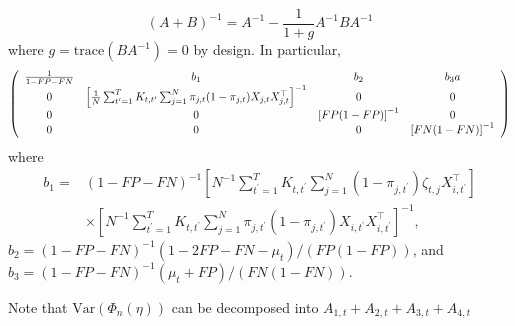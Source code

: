 \documentclass[12pt]{amsart}
\numberwithin{equation}{section}
\theoremstyle{plain}
\begin{document}
$$
(A+B)^{-1} = A^{-1} - \frac{1}{1+g} A^{-1} B A^{-1}
$$
where $g = \text{trace}(BA^{-1}) = 0$ by design.  In particular,
$$
\left (
\begin{array}{c c c c}
\frac{1}{1-FP-FN} & b_1 & b_2  & b_3a  \\
0 & \left[\frac{1}{N} \sum_{t^\prime=1}^T K_{t,t^\prime} \sum_{j=1}^N \pi_{j,t} (1-\pi_{j,t}) X_{j,t} X_{j,t}^\top\right]^{-1} & 0 & 0\\
0 & 0 & \left[ FP (1-FP) \right]^{-1}  & 0\\
0 & 0 & 0 & \left[ FN (1-FN) \right]^{-1}
\end{array}
\right)
$$
where
\begin{align*}
b_1 =& (1-FP-FN)^{-1} \left[ N^{-1} \sum_{t^\prime=1}^T K_{t,t^\prime} \sum_{j=1}^N (1-\pi_{j,t^\prime}) \zeta_{t,j} X_{i,t^\prime}^\top \right] \\
&\times \left[N^{-1} \sum_{t^\prime=1}^T K_{t,t^\prime} \sum_{j=1}^N \pi_{j,t^\prime} (1-\pi_{j,t^\prime}) X_{i,t^\prime} X_{i,t^\prime}^\top \right]^{-1},
\end{align*}
$b_2 = (1-FP-FN)^{-1} (1-2FP-FN-\mu_t) / (FP(1-FP))$, and $b_3 = (1-FP-FN)^{-1} (\mu_t+FP) / (FN(1-FN))$.

Note that $\text{Var}(\Phi_n(\eta))$ can be decomposed into $A_{1,t} + A_{2,t} + A_{3,t} + A_{4,t}$
\end{document}
